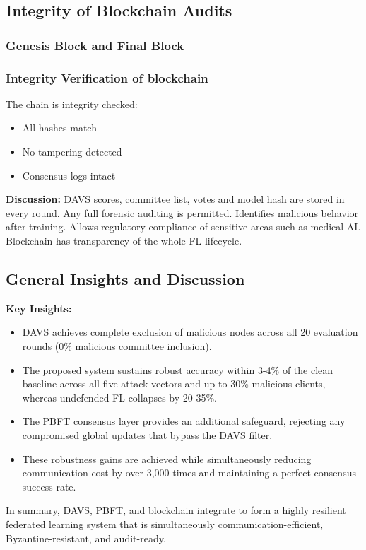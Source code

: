 \documentclass[12pt,a4paper]{article}
\begin{document}
\subsection{Integrity of Blockchain Audits}
\subsubsection{Genesis Block and Final Block}
\subsubsection{Integrity Verification of blockchain}
The chain is integrity checked:
\begin{itemize}
    \item All hashes match
    \item No tampering detected
    \item Consensus logs intact
\end{itemize}

\textbf{Discussion:}
DAVS scores, committee list, votes and model hash are stored in every round. Any full forensic auditing is permitted. Identifies malicious behavior after training. Allows regulatory compliance of sensitive areas such as medical AI. Blockchain has transparency of the whole FL lifecycle.

\subsection{General Insights and Discussion}
\textbf{Key Insights:}
\begin{itemize}
    \item DAVS achieves complete exclusion of malicious nodes across all 20 evaluation rounds (0\% malicious committee inclusion).
    \item The proposed system sustains robust accuracy within 3-4\% of the clean baseline across all five attack vectors and up to 30\% malicious clients, whereas undefended FL collapses by 20-35\%.
    \item The PBFT consensus layer provides an additional safeguard, rejecting any compromised global updates that bypass the DAVS filter.
    \item These robustness gains are achieved while simultaneously reducing communication cost by over 3,000 times and maintaining a perfect consensus success rate.
\end{itemize}
In summary, DAVS, PBFT, and blockchain integrate to form a highly resilient federated learning system that is simultaneously communication-efficient, Byzantine-resistant, and audit-ready.
\end{document}
